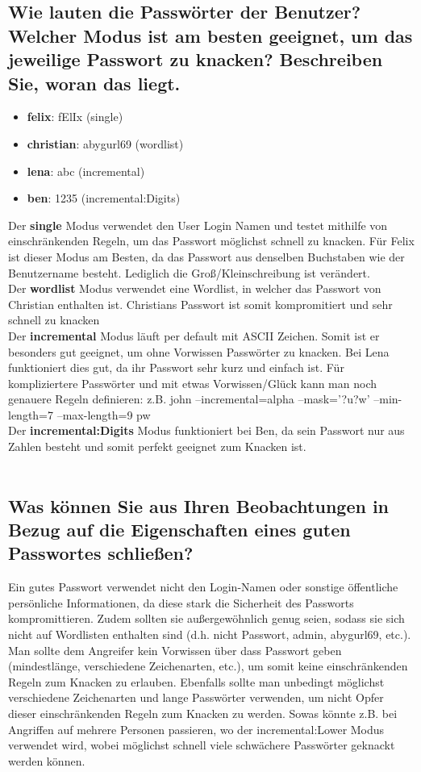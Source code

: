 \subsection{Wie lauten die Passwörter der Benutzer? Welcher Modus ist am besten geeignet, um das jeweilige Passwort zu knacken? Beschreiben Sie, woran das liegt.}

\begin{itemize} 
	\item \textbf{felix}: fElIx (single)
	\item \textbf{christian}: abygurl69	(wordlist)
	\item \textbf{lena}: abc (incremental)
	\item \textbf{ben}: 1235 (incremental:Digits)
\end{itemize}

Der \textbf{single} Modus verwendet den User Login Namen und testet mithilfe von einschränkenden Regeln, um das Passwort möglichst schnell zu knacken. Für Felix ist dieser Modus am Besten, da das Passwort aus denselben Buchstaben wie der Benutzername besteht. Lediglich die Groß/Kleinschreibung ist verändert.\\
Der \textbf{wordlist} Modus verwendet eine Wordlist, in welcher das Passwort von Christian enthalten ist. Christians Passwort ist somit kompromitiert und sehr schnell zu knacken\\
Der \textbf{incremental} Modus läuft per default mit ASCII Zeichen. Somit ist er besonders gut geeignet, um ohne Vorwissen Passwörter zu knacken. Bei Lena funktioniert dies gut, da ihr Passwort sehr kurz und einfach ist. Für kompliziertere Passwörter und mit etwas Vorwissen/Glück kann man noch genauere Regeln definieren:  z.B. john --incremental=alpha --mask='?u?w' --min-length=7 --max-length=9 pw\\
Der \textbf{incremental:Digits} Modus funktioniert bei Ben, da sein Passwort nur aus Zahlen besteht und somit perfekt geeignet zum Knacken ist.\\
\\
\subsection{Was können Sie aus Ihren Beobachtungen in Bezug auf die Eigenschaften eines guten Passwortes schließen?}
Ein gutes Passwort verwendet nicht den Login-Namen oder sonstige öffentliche persönliche Informationen, da diese stark die Sicherheit des Passworts kompromittieren. Zudem sollten sie außergewöhnlich genug seien, sodass sie sich nicht auf Wordlisten enthalten sind (d.h. nicht Passwort, admin, abygurl69, etc.). Man sollte dem Angreifer kein Vorwissen über dass Passwort geben (mindestlänge, verschiedene Zeichenarten, etc.), um somit keine einschränkenden Regeln zum Knacken zu erlauben. Ebenfalls sollte man unbedingt möglichst verschiedene Zeichenarten und lange Passwörter verwenden, um nicht Opfer dieser einschränkenden Regeln zum Knacken zu werden. Sowas könnte z.B. bei Angriffen auf mehrere Personen passieren, wo der incremental:Lower Modus verwendet wird, wobei möglichst schnell viele schwächere Passwörter geknackt werden können.\\